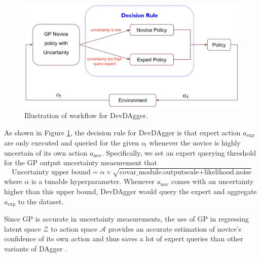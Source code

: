\documentclass[11pt, reqno, letterpaper, twoside]{amsart}
\begin{document}
\begin{figure}[htbp!]
	\centering
	\includegraphics[width=\linewidth]{imgs/dev_dagger_diagram.png}
	\caption{Illustration of workflow for DevDAgger.}
	\label{fig:devdagger_diagram}
\end{figure}

As shown in Figure \ref{fig:devdagger_diagram}, the decision rule for DevDAgger is that expert action $a_\text{exp}$ are only executed and queried for the given $o_t$ whenever the novice is highly uncertain of its own action $a_\text{nov}$. Specifically, we set an expert querying threshold for the GP output uncertainty measurement that
\begin{equation}
	\text{Uncertainty upper bound}=\alpha \times \sqrt{\text{covar\_module.outputscale}+\text{likelihood.noise}}
\end{equation}
where $\alpha$ is a tunable hyperparameter. Whenever $a_\text{nov}$ comes with an uncertainty higher than this upper bound, DevDAgger would query the expert and aggregate $a_\text{exp}$ to the dataset.

Since GP is accurate in uncertainty measurements, the use of GP in regressing latent space $\mathcal{Z}$ to action space $\mathcal{A}$ provides an accurate estimation of novice's confidence of its own action and thus saves a lot of expert queries than other variants of DAgger \cite{ensemble-dagger}.
\end{document}
